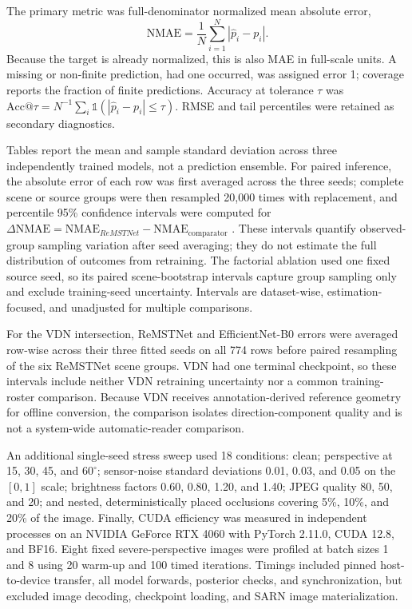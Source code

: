 \documentclass[electronics,article,submit,oneauthor]{Definitions/mdpi}
\newcommand{\modelname}{ReMSTNet}
\begin{document}
The primary metric was full-denominator normalized mean absolute error,
\begin{equation}
\mathrm{NMAE}=\frac{1}{N}\sum_{i=1}^{N}|\hat{p}_i-p_i|.
\end{equation}
Because the target is already normalized, this is also MAE in full-scale units. A missing or non-finite prediction, had one occurred, was assigned error 1; coverage reports the fraction of finite predictions. Accuracy at tolerance $\tau$ was $\mathrm{Acc}@\tau=N^{-1}\sum_i\mathbb{1}(|\hat{p}_i-p_i|\leq\tau)$. RMSE and tail percentiles were retained as secondary diagnostics.

Tables report the mean and sample standard deviation across three independently trained models, not a prediction ensemble. For paired inference, the absolute error of each row was first averaged across the three seeds; complete scene or source groups were then resampled 20,000 times with replacement, and percentile 95\% confidence intervals were computed for $\Delta\mathrm{NMAE}=\mathrm{NMAE}_{\modelname}-\mathrm{NMAE}_{\mathrm{comparator}}$ \cite{davison1997bootstrap}. These intervals quantify observed-group sampling variation after seed averaging; they do not estimate the full distribution of outcomes from retraining. The factorial ablation used one fixed source seed, so its paired scene-bootstrap intervals capture group sampling only and exclude training-seed uncertainty. Intervals are dataset-wise, estimation-focused, and unadjusted for multiple comparisons.

For the VDN intersection, ReMSTNet and EfficientNet-B0 errors were averaged row-wise across their three fitted seeds on all 774 rows before paired resampling of the six ReMSTNet scene groups. VDN had one terminal checkpoint, so these intervals include neither VDN retraining uncertainty nor a common training-roster comparison. Because VDN receives annotation-derived reference geometry for offline conversion, the comparison isolates direction-component quality and is not a system-wide automatic-reader comparison.

An additional single-seed stress sweep used 18 conditions: clean; perspective at 15, 30, 45, and $60^{\circ}$; sensor-noise standard deviations 0.01, 0.03, and 0.05 on the $[0,1]$ scale; brightness factors 0.60, 0.80, 1.20, and 1.40; JPEG quality 80, 50, and 20; and nested, deterministically placed occlusions covering 5\%, 10\%, and 20\% of the image. Finally, CUDA efficiency was measured in independent processes on an NVIDIA GeForce RTX 4060 with PyTorch 2.11.0, CUDA 12.8, and BF16. Eight fixed severe-perspective images were profiled at batch sizes 1 and 8 using 20 warm-up and 100 timed iterations. Timings included pinned host-to-device transfer, all model forwards, posterior checks, and synchronization, but excluded image decoding, checkpoint loading, and SARN image materialization.
\end{document}
